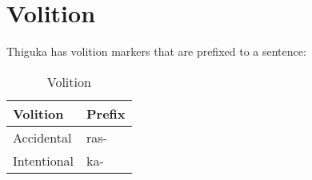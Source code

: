 \section{Volition}
Thiguka has volition markers that are prefixed to a sentence:

\begin{table}[h]
    \centering
    \caption{Volition}
    \begin{tabularx}{8cm}{|X|X|}
        \hline
        \textbf{Volition} & \textbf{Prefix} \\
        \hline
        Accidental & ras- \\
        Intentional & ka- \\
        \hline
    \end{tabularx}
\end{table}

